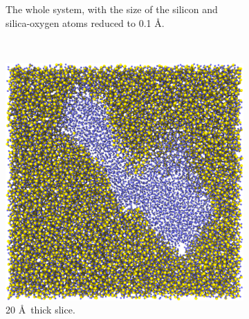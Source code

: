 \begin{figure}[!p]
\begin{subfigure}[t]{\myfigwidth}
        \caption{The whole system, with the size of the silicon and silica-oxygen atoms reduced to 0.1 \AA.}%
    \end{subfigure}%
    \vspace{10pt}\\%
    \begin{subfigure}[t]{\myfigwidth}%
        \centering%
        \includegraphics[width=\textwidth]{images/systems/trimmed-rough_fracture03_07}%
        \caption{20 \AA\ thick slice.}%
    \end{subfigure}%
    \hfill%
        \begin{subfigure}[t]{\myfigwidth}%
        \centering%

\end{subfigure}
\end{figure}
